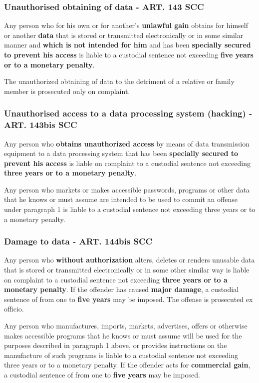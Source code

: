 \subsubsection{Unauthorised obtaining of data - ART. 143 SCC}
\begin{compactenum}
	\item Any person who for his own or for another's \textbf{unlawful gain} obtains for himself or another \textbf{data} that is stored or transmitted electronically or in some similar manner and \textbf{which is not intended for him} and has been \textbf{specially secured to prevent his access} is liable to a custodial sentence not exceeding \textbf{five years or to a monetary penalty}.
	\item The unauthorized obtaining of data to the detriment of a relative or family member is prosecuted only on complaint.
\end{compactenum}

\subsubsection{Unauthorised access to a data processing system (hacking) - ART. 143bis SCC}
\begin{compactenum}
	\item Any person who \textbf{obtains unauthorized access} by means of data transmission equipment to a data processing system that has been \textbf{specially secured to prevent his access} is liable on complaint to a custodial sentence not exceeding \textbf{three years or to a monetary penalty}.
	\item Any person who markets or makes accessible passwords, programs or other data that he knows or must assume are intended to be used to commit an offense under paragraph 1 is liable to a custodial sentence not exceeding three years or to a monetary penalty.
\end{compactenum}

\subsubsection{Damage to data - ART. 144bis SCC}
\begin{compactenum}
	\item Any person who \textbf{without authorization} alters, deletes or renders unusable data that is stored or transmitted electronically or in some other similar way is liable on complaint to a custodial sentence not exceeding \textbf{three years or to a monetary penalty}. If the offender has caused \textbf{major damage}, a custodial sentence of from one to \textbf{five years} may be imposed. The offense is prosecuted ex officio.
	\item Any person who manufactures, imports, markets, advertises, offers or otherwise makes accessible programs that he knows or must assume will be used for the purposes described in paragraph 1 above, or provides instructions on the manufacture of such programs is liable to a custodial sentence not exceeding three years or to a monetary penalty. If the offender acts for \textbf{commercial gain}, a custodial sentence of from one to	\textbf{five years} may be imposed.
\end{compactenum}

